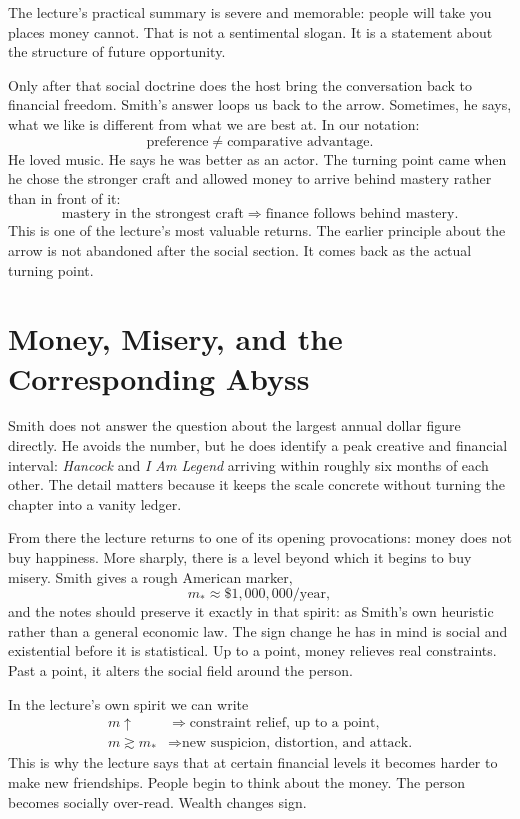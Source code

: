 The lecture's practical summary is severe and memorable: people will take you places money cannot. That is not a sentimental slogan. It is a statement about the structure of future opportunity.

Only after that social doctrine does the host bring the conversation back to financial freedom. Smith's answer loops us back to the arrow. Sometimes, he says, what we like is different from what we are best at. In our notation:
\begin{equation}
\text{preference}\neq\text{comparative advantage}.
\end{equation}
He loved music. He says he was better as an actor. The turning point came when he chose the stronger craft and allowed money to arrive behind mastery rather than in front of it:
\begin{equation}
\text{mastery in the strongest craft}
\Longrightarrow
\text{finance follows behind mastery}.
\end{equation}
This is one of the lecture's most valuable returns. The earlier principle about the arrow is not abandoned after the social section. It comes back as the actual turning point.

\section{Money, Misery, and the Corresponding Abyss}

Smith does not answer the question about the largest annual dollar figure directly. He avoids the number, but he does identify a peak creative and financial interval: \emph{Hancock} and \emph{I Am Legend} arriving within roughly six months of each other. The detail matters because it keeps the scale concrete without turning the chapter into a vanity ledger.

From there the lecture returns to one of its opening provocations: money does not buy happiness. More sharply, there is a level beyond which it begins to buy misery. Smith gives a rough American marker,
\begin{equation}
m_\ast \approx \$1{,}000{,}000/\text{year},
\end{equation}
and the notes should preserve it exactly in that spirit: as Smith's own heuristic rather than a general economic law. The sign change he has in mind is social and existential before it is statistical. Up to a point, money relieves real constraints. Past a point, it alters the social field around the person.

In the lecture's own spirit we can write
\begin{align}
m \uparrow
&\Longrightarrow
\text{constraint relief, up to a point},\\
m \gtrsim m_\ast
&\Longrightarrow
\text{new suspicion, distortion, and attack.}
\end{align}
This is why the lecture says that at certain financial levels it becomes harder to make new friendships. People begin to think about the money. The person becomes socially over-read. Wealth changes sign.

